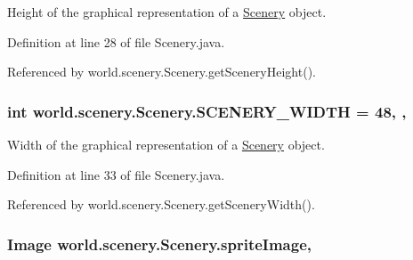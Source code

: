 Height of the graphical representation of a \hyperlink{classworld_1_1scenery_1_1_scenery}{Scenery} object. 



Definition at line 28 of file Scenery.\-java.



Referenced by world.\-scenery.\-Scenery.\-get\-Scenery\-Height().

\hypertarget{classworld_1_1scenery_1_1_scenery_affb047c028883c6d069a03ef0f1caeb8}{
\subsubsection[{S\-C\-E\-N\-E\-R\-Y\-\_\-\-W\-I\-D\-T\-H}]{\setlength{\rightskip}{0pt plus 5cm}int world.\-scenery.\-Scenery.\-S\-C\-E\-N\-E\-R\-Y\-\_\-\-W\-I\-D\-T\-H = 48\hspace{0.3cm}{\ttfamily [static]}, {\ttfamily [protected]}, {\ttfamily [inherited]}}}\label{classworld_1_1scenery_1_1_scenery_affb047c028883c6d069a03ef0f1caeb8}


Width of the graphical representation of a \hyperlink{classworld_1_1scenery_1_1_scenery}{Scenery} object. 



Definition at line 33 of file Scenery.\-java.



Referenced by world.\-scenery.\-Scenery.\-get\-Scenery\-Width().

\hypertarget{classworld_1_1scenery_1_1_scenery_a512d9c0a154e6843389e343d80843326}{
\subsubsection[{sprite\-Image}]{\setlength{\rightskip}{0pt plus 5cm}Image world.\-scenery.\-Scenery.\-sprite\-Image\hspace{0.3cm}{\ttfamily [protected]}, {\ttfamily [inherited]}}}\label{classworld_1_1scenery_1_1_scenery_a512d9c0a154e6843389e343d80843326}


